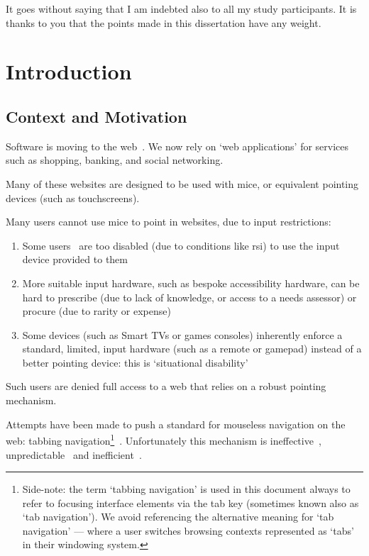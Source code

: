 \documentclass[11pt,openright,a4paper]{report}
\begin{document}
It goes without saying that I am indebted also to all my study participants. It is thanks to you that the points made in this dissertation have any weight.
\newpage


\setcounter{page}{1}


\chapter{Introduction}

\section{Context and Motivation}
Software is moving to the web~\cite{ginige2001web}. We now rely on `web applications' for services such as shopping, banking, and social networking.

Many of these websites are designed to be used with mice, or equivalent pointing devices (such as touchscreens).

Many users cannot use mice to point in websites, due to input restrictions:
\begin{enumerate}
\item Some users~\cite{rsiprevalence} are too disabled (due to conditions like \gls{rsi}) to use the input device provided to them~\cite{trewin1999keyboard}
\item More suitable input hardware, such as bespoke accessibility hardware, can be hard to prescribe (due to lack of knowledge, or access to a needs assessor) or procure (due to rarity or expense)
\item Some devices (such as Smart TVs or games consoles) inherently enforce a standard, limited, input hardware (such as a remote or gamepad) instead of a better pointing device: this is `situational disability'~\cite{nijholt2009turning}
\end{enumerate}

Such users are denied full access to a web that relies on a robust pointing mechanism.

Attempts have been made to push a standard for mouseless navigation on the web: tabbing navigation\footnote{Side-note: the term `tabbing navigation' is used in this document always to refer to focusing interface elements via the tab key (sometimes known also as `tab navigation'). We avoid referencing the alternative meaning for `tab navigation' --- where a user switches browsing contexts represented as `tabs' in their windowing system.}~\cite{chisholm2001web,wcag}. Unfortunately this mechanism is ineffective~\cite{hoffman2005emerging}, unpredictable~\cite{hoffman2005emerging} and inefficient~\cite{schrepp2006efficiency}.
\end{document}
